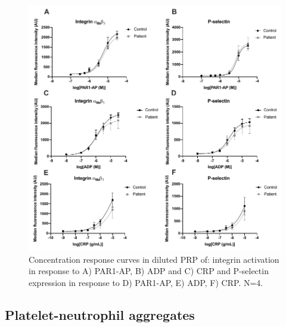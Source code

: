 \documentclass[11pt,twoside]{bristolthesis}
\begin{document}
\begin{figure}
\includegraphics{figure/Bariatric_study/Agonist_Integrin_Pselectin} \caption[Concentration response curves of integrin activation and P-selectin expression]{Concentration response curves in diluted PRP of: integrin activation in response to A) PAR1-AP, B) ADP and C) CRP and P-selectin expression in response to D) PAR1-AP, E) ADP, F) CRP. N=4.}\label{fig:agonist-integrin-pselectin}
\end{figure}
\hypertarget{platelet-neutrophil-aggregates}{%
\subsection{Platelet-neutrophil aggregates}\label{platelet-neutrophil-aggregates}}
\end{document}
